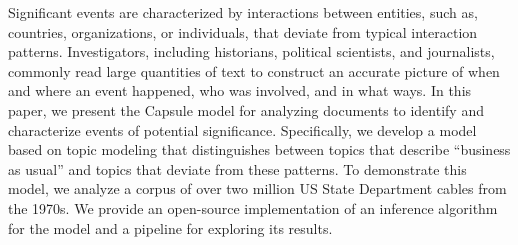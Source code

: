 
Significant events are characterized by interactions between entities,
such as, countries, organizations, or individuals, that deviate from
typical interaction patterns. Investigators, including historians,
political scientists, and journalists, commonly read large quantities
of text to construct an accurate picture of when and where an event
happened, who was involved, and in what ways. In this paper, we
present the Capsule model for analyzing documents to identify and
characterize events of potential significance. Specifically, we
develop a model based on topic modeling that distinguishes between
topics that describe ``business as usual'' and topics that deviate
from these patterns. To demonstrate this model, we analyze a corpus of
over two million US State Department cables from the 1970s. We provide
an open-source implementation of an inference algorithm for the model
and a pipeline for exploring its results.
